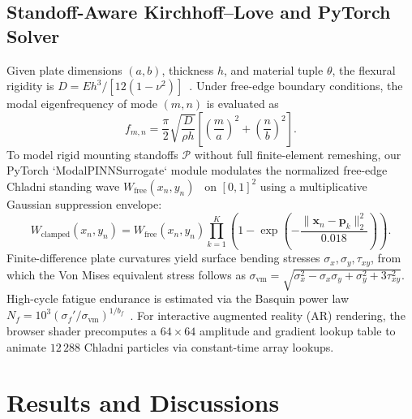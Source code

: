 \documentclass[journal]{IEEEtran}
\begin{document}
\subsection{Standoff-Aware Kirchhoff--Love and PyTorch Solver}
Given plate dimensions $(a, b)$, thickness $h$, and material tuple $\theta$, the flexural rigidity is $D = E h^3 / [12(1 - \nu^2)]$~\cite{timoshenko1959theory}. Under free-edge boundary conditions, the modal eigenfrequency of mode $(m, n)$ is evaluated as~\cite{leissa1969vibration}
\begin{equation}
f_{m,n} = \frac{\pi}{2} \sqrt{\frac{D}{\rho h}} \left[ \left(\frac{m}{a}\right)^2 + \left(\frac{n}{b}\right)^2 \right].
\label{eq:eigenfreq}
\end{equation}
To model rigid mounting standoffs $\mathcal{P}$ without full finite-element remeshing, our PyTorch `ModalPINNSurrogate` module modulates the normalized free-edge Chladni standing wave $W_{\mathrm{free}}(x_n, y_n)$~\cite{chladni1787entdeckungen} on $[0, 1]^2$ using a multiplicative Gaussian suppression envelope:
\begin{equation}
W_{\mathrm{clamped}}(x_n, y_n) = W_{\mathrm{free}}(x_n, y_n) \prod_{k=1}^{K} \left(1 - \exp\!\left(-\frac{\|\mathbf{x}_n - \mathbf{p}_k\|_2^2}{0.018}\right)\right).
\label{eq:standoff}
\end{equation}
Finite-difference plate curvatures yield surface bending stresses $\sigma_x, \sigma_y, \tau_{xy}$, from which the Von Mises equivalent stress follows as $\sigma_{\mathrm{vm}} = \sqrt{\sigma_x^2 - \sigma_x \sigma_y + \sigma_y^2 + 3\tau_{xy}^2}$. High-cycle fatigue endurance is estimated via the Basquin power law $N_f = 10^3 (\sigma_f' / \sigma_{\mathrm{vm}})^{1/b_f}$~\cite{basquin1910exponential}. For interactive augmented reality (AR) rendering, the browser shader precomputes a $64 \times 64$ amplitude and gradient lookup table to animate $12\,288$ Chladni particles via constant-time array lookups.

\section{Results and Discussions}
\end{document}
